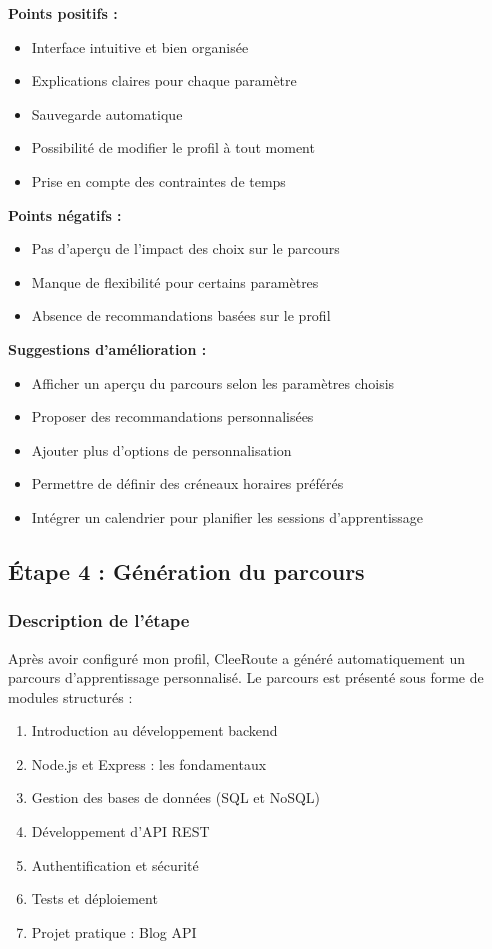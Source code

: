 \documentclass[12pt,a4paper]{article}
\begin{document}
\textbf{Points positifs :}
\begin{itemize}
    \item Interface intuitive et bien organisée
    \item Explications claires pour chaque paramètre
    \item Sauvegarde automatique
    \item Possibilité de modifier le profil à tout moment
    \item Prise en compte des contraintes de temps
\end{itemize}

\textbf{Points négatifs :}
\begin{itemize}
    \item Pas d'aperçu de l'impact des choix sur le parcours
    \item Manque de flexibilité pour certains paramètres
    \item Absence de recommandations basées sur le profil
\end{itemize}

\textbf{Suggestions d'amélioration :}
\begin{itemize}
    \item Afficher un aperçu du parcours selon les paramètres choisis
    \item Proposer des recommandations personnalisées
    \item Ajouter plus d'options de personnalisation
    \item Permettre de définir des créneaux horaires préférés
    \item Intégrer un calendrier pour planifier les sessions d'apprentissage
\end{itemize}

\subsection{Étape 4 : Génération du parcours}

\subsubsection{Description de l'étape}

Après avoir configuré mon profil, CleeRoute a généré automatiquement un parcours d'apprentissage personnalisé. Le parcours est présenté sous forme de modules structurés :
\begin{enumerate}
    \item Introduction au développement backend
    \item Node.js et Express : les fondamentaux
    \item Gestion des bases de données (SQL et NoSQL)
    \item Développement d'API REST
    \item Authentification et sécurité
    \item Tests et déploiement
    \item Projet pratique : Blog API
\end{enumerate}
\end{document}
